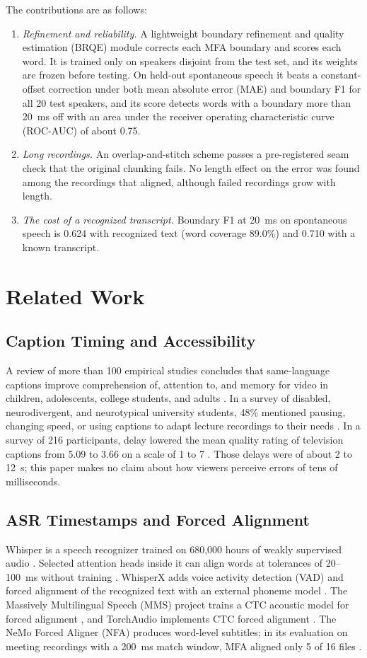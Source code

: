 \documentclass[conference,a4paper]{IEEEtran}
\begin{document}
The contributions are as follows:
\begin{enumerate}
\item \emph{Refinement and reliability.} A lightweight boundary refinement and quality estimation (BRQE) module corrects each MFA boundary and scores each word. It is trained only on speakers disjoint from the test set, and its weights are frozen before testing. On held-out spontaneous speech it beats a constant-offset correction under both mean absolute error (MAE) and boundary F1 for all 20 test speakers, and its score detects words with a boundary more than 20~ms off with an area under the receiver operating characteristic curve (ROC-AUC) of about 0.75.
\item \emph{Long recordings.} An overlap-and-stitch scheme passes a pre-registered seam check that the original chunking fails. No length effect on the error was found among the recordings that aligned, although failed recordings grow with length.
\item \emph{The cost of a recognized transcript.} Boundary F1 at 20~ms on spontaneous speech is 0.624 with recognized text (word coverage 89.0\%) and 0.710 with a known transcript.
\end{enumerate}

\section{Related Work}
\subsection{Caption Timing and Accessibility}
A review of more than 100 empirical studies concludes that same-language captions improve comprehension of, attention to, and memory for video in children, adolescents, college students, and adults \cite{Gernsbacher2015}. In a survey of disabled, neurodivergent, and neurotypical university students, 48\% mentioned pausing, changing speed, or using captions to adapt lecture recordings to their needs \cite{Horlin2024}. In a survey of 216 participants, delay lowered the mean quality rating of television captions from 5.09 to 3.66 on a scale of 1 to 7 \cite{Thompson2026}. Those delays were of about 2 to 12~s; this paper makes no claim about how viewers perceive errors of tens of milliseconds.

\subsection{ASR Timestamps and Forced Alignment}
Whisper is a speech recognizer trained on 680,000 hours of weakly supervised audio \cite{Radford2023}. Selected attention heads inside it can align words at tolerances of 20--100~ms without training \cite{Yeh2025}. WhisperX adds voice activity detection (VAD) and forced alignment of the recognized text with an external phoneme model \cite{Bain2023}. The Massively Multilingual Speech (MMS) project trains a CTC acoustic model for forced alignment \cite{Pratap2024}, and TorchAudio implements CTC forced alignment \cite{Hwang2023}. The NeMo Forced Aligner (NFA) produces word-level subtitles; in its evaluation on meeting recordings with a 200~ms match window, MFA aligned only 5 of 16 files \cite{Rastorgueva2023}.
\end{document}
